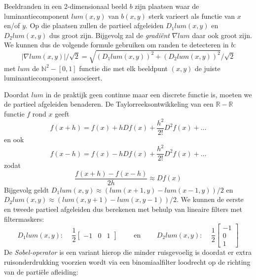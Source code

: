 Beeldranden in een 2-dimensionaal beeld $b$ zijn plaatsen waar de luminantiecomponent $lum(x,y)$ van $b(x,y)$ 
sterk varieert als functie van $x$ en/of $y$. Op die plaatsen zullen de partieel afgeleiden $D_1 lum(x,y)$ en 
$D_2 lum(x,y)$ dus groot zijn. Bijgevolg zal de \emph{gradi\"ent} $\nabla lum$ daar ook groot zijn. We kunnen 
dus de volgende formule gebruiken om randen te detecteren in $b$: 
\begin{displaymath}
|\nabla lum(x,y)| / \sqrt{2} = \sqrt{(D_1 lum(x,y))^2 + (D_2 lum(x,y))^2} / \sqrt{2}
\end{displaymath}
met $lum$ de $\mathbb{N}^2 - [0,1]$ functie die met elk beeldpunt $(x,y)$ de juiste luminantiecomponent associeert.

Doordat $lum$ in de praktijk geen continue maar een discrete functie is, moeten we de partieel afgeleiden benaderen.
De Taylorreeksontwikkeling van een $\mathbb{R} - \mathbb{R}$ functie $f$ rond $x$ geeft
\begin{displaymath}
f(x+h) = f(x) + h D f(x) + \frac{h^2}{2!} D^2 f(x) + \ldots
\end{displaymath}
en ook
\begin{displaymath}
f(x-h) = f(x) - h D f(x) + \frac{h^2}{2!} D^2 f(x) + \ldots
\end{displaymath}
zodat
\begin{displaymath}
\frac{f(x+h) - f(x-h)}{2h} \approx D f(x)
\end{displaymath}
Bijgevolg geldt $D_1 lum(x,y) \approx (lum(x+1,y) - lum(x-1,y))/2$ en $D_2 lum(x,y) \approx (lum(x,y+1) - lum(x,y-1))/2$. We
kunnen de eerste en tweede partieel afgeleiden dus berekenen met behulp van lineaire filters met filtermaskers:
\begin{displaymath}
D_1 lum(x,y)\textrm{: }\quad \frac{1}{2} \left[ \begin{array}{ccc} -1 & 0 & 1 \end{array} \right] \qquad \textrm{ en } 
\qquad D_2 lum(x,y)\textrm{: }\quad \frac{1}{2} \left[ \begin{array}{c} -1 \\ 0 \\ 1 \end{array} \right]
\end{displaymath}
De \emph{Sobel-operator} is een variant hierop die minder ruisgevoelig is doordat er 
extra ruisonderdrukking voorzien wordt via een binomiaalfilter loodrecht op de richting 
van de parti\"ele afleiding:
